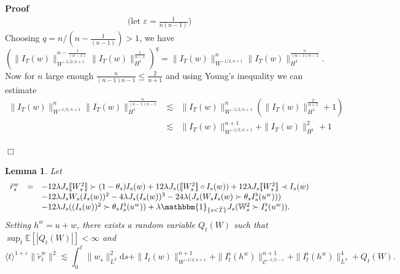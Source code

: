 \documentclass[11pt]{article}
\newcommand{\mathd}{\mathrm{d}}
\newenvironment{proof}{\noindent\textbf{Proof\ }}{\hspace*{\fill}$\Box$\medskip}
\newtheorem{lemma}{Lemma}
\newcommand{\VV}{\mathscr{C}}
\begin{document}
\begin{proof}
\[\begin{array}{lll}
       \text{(let $\varepsilon = \tfrac{1}{n (n - 1)}$)}
     \end{array} \]
  Choosing $q = n / \left( n - \frac{1}{(n - 1)} \right) > 1$, we have
  \[ \left( \| I_T (w) \|_{W^{- 1 / 2, n + 1}}^{n - \frac{1}{(n - 1)}} \|
     I_T (w) \|^{\frac{1}{n - 1}}_{H^1} \right)^q = \| I_T (w) \|_{W^{- 1 / 2,
     n + 1}}^n \| I_T (w) \|^{\frac{n}{(n - 1) n - 1}}_{H^1} . \]
  Now for $n$ large enough $\frac{n}{(n - 1) n - 1} \leqslant \frac{2}{n + 1}$
  and using Young's inequality we can estimate
  \[ \begin{array}{lll}
       \| I_T (w) \|_{W^{- 1 / 2, n + 1}}^n \| I_T (w) \|^{\frac{n}{(n - 1)
       n - 1}}_{H^1} & \lesssim & \| I_T (w) \|_{W^{- 1 / 2, n + 1}}^n
       \left( \| I_T (w) \|^{\frac{2}{n + 1}}_{H^1} + 1 \right)\\
       & \lesssim & \| I_T (w) \|_{W^{- 1 / 2, n + 1}}^{n + 1} + \| I_T
       (w) \|^2_{H^1} + 1
     \end{array} \]
  
\end{proof}

\begin{lemma}
  \label{lemma:estimateremainder}Let
  \[ \begin{array}{lll}
       \tilde{r}_s^w & = & - 12 \lambda J_s \llbracket W_s^2 \rrbracket \succ
       (1 - \theta_s) I_s (w) + 12 \lambda J_s (\llbracket W_s^2 \rrbracket
       \circ I_s (w)) + 12 \lambda J_s \llbracket W_s^2 \rrbracket \prec I_s
       (w)\\
       &  & - 12 \lambda J_s W_s (I_s (w))^2 - 4 \lambda J_s (I_s (w))^3 - 24
       \lambda (J_s (W_s I_s (w) \succ \theta_s I^{\flat}_s (u^w)))\\
       &  & - 12 \lambda J_s ((I_s (w))^2 \succ \theta_s I^{\flat}_s (u^w)) +
       \lambda \mathbbm{1}_{\{ s < \bar{T} \}} J_s (\mathbb{W}_s^2 \succ
       I_s^{\flat} (u^w)) .
     \end{array} \]
  Setting $h^w = u + w$, there exists a random variable $Q_t (W)$ such that
  $\sup_t \mathbb{E} [| Q_t (W) |] < \infty$ and
  \[ \langle t \rangle^{1 + \varepsilon} \| \tilde{r}_t^w \|^2 \lesssim
     \int^t_0 \| w_s \|_{L^2}^2 \mathd s + \| I_t (w) \|^{n + 1}_{W^{- 1 / 2,
     n + 1}} + \|I_t^{\flat} (h^w) \|^{n + 1}_{\VV^{- 1 / 2 - \varepsilon}} +
     \| I^{\flat}_t (h^w) \|^4_{L^4} + Q_t (W) . \]
\end{lemma}
\end{document}
